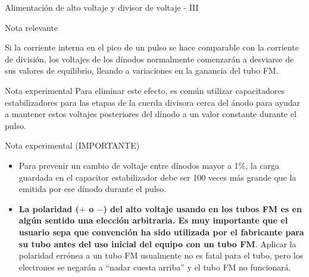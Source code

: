 \documentclass[a4paper,10pt]{beamer}
\begin{document}
\begin{frame}{Alimentación de alto voltaje y divisor de voltaje - III}
 \begin{block}{Nota relevante}
  \begin{justify}
  \footnotesize
   Si la corriente interna en el pico de un pulso se hace comparable con la corriente 
   de división, los voltajes de los dínodos normalmente comenzarán a desviarse de 
   sus valores de equilibrio, lleando a variaciones en la ganancia del tubo FM.
  \end{justify}
 \end{block}
  
  \begin{exampleblock}{Nota experimental}
  \footnotesize
   Para eliminar este efecto, es común utilizar capacitadores estabilizadores para 
   las etapas de la cuerda divisora cerca del ánodo para ayudar a mantener estos 
   voltajes posteriores del dínodo a un valor constante durante el pulso.
  \end{exampleblock}
  
  \begin{exampleblock}{Nota experimental (IMPORTANTE)}
   \footnotesize
   \begin{itemize}[<+->]
    \item \begin{justify}
          Para prevenir un cambio de voltaje entre dínodos mayor a 1\%, la carga 
          guardada en el capacitor estabilizador debe ser 100 veces más grande que 
          la emitida por ese dínodo durante el pulso.
          \end{justify}
     \item \begin{justify}
          \textbf{La polaridad ($+$ o $-$) del alto voltaje usando en los tubos FM 
          es en algún sentido una elección arbitraria. Es muy importante que el usuario 
          sepa que convención ha sido utilizada por el fabricante para su tubo 
          antes del uso inicial del equipo con un tubo FM}. Aplicar la polaridad 
          errónea a un tubo FM usualmente no es fatal para el tubo, pero los 
          electrones se negarán a ``nadar cuesta arriba'' y el tubo FM no funcionará.
          \end{justify}
   \end{itemize}

  \end{exampleblock}

\end{frame}
\end{document}
